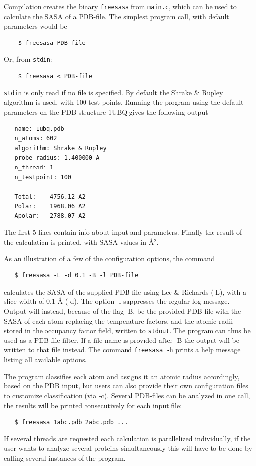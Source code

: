 \documentclass[a4paper,11pt]{article}
\begin{document}
Compilation creates the binary \verb|freesasa| from
\verb|main.c|, which can be used to calculate the SASA of a
PDB-file. The simplest program call, with default parameters would be
\begin{verbatim}
    $ freesasa PDB-file
\end{verbatim}
Or, from \verb|stdin|:
\begin{verbatim} 
    $ freesasa < PDB-file    
\end{verbatim}
\verb|stdin| is only read if no file is specified. By default the
Shrake \& Rupley algorithm is used, with 100 test points. Running the
program using the default parameters on the PDB structure 1UBQ gives
the following output
\begin{verbatim}
   name: 1ubq.pdb
   n_atoms: 602
   algorithm: Shrake & Rupley
   probe-radius: 1.400000 A
   n_thread: 1
   n_testpoint: 100
   
   Total:    4756.12 A2
   Polar:    1968.06 A2
   Apolar:   2788.07 A2
\end{verbatim}
The first 5 lines contain info about input and parameters. Finally the
result of the calculation is printed, with SASA values in Å$^2$.

As an illustration of a few of the configuration options, the command
\begin{verbatim}
   $ freesasa -L -d 0.1 -B -l PDB-file
\end{verbatim}
calculates the SASA of the supplied PDB-file using Lee \& Richards
(-L), with a slice width of 0.1 Å (-d). The option -l suppresses the
regular log message. Output will instead, because of the flag -B, be
the provided PDB-file with the SASA of each atom replacing the
temperature factors, and the atomic radii stored in the occupancy
factor field, written to \verb|stdout|. The program can thus be used
as a PDB-file filter. If a file-name is provided after -B the output
will be written to that file instead. The command \verb|freesasa -h|
prints a help message listing all available options.

The program classifies each atom and assigns it an atomic radius
accordingly, based on the PDB input, but users can also provide their
own configuration files to customize classification (via -c). Several
PDB-files can be analyzed in one call, the results will be printed
consecutively for each input file:
\begin{verbatim}
   $ freesasa 1abc.pdb 2abc.pdb ...
\end{verbatim}
If several threads are requested each calculation is parallelized
individually, if the user wants to analyze several proteins
simultaneously this will have to be done by calling several instances
of the program.
\end{document}
